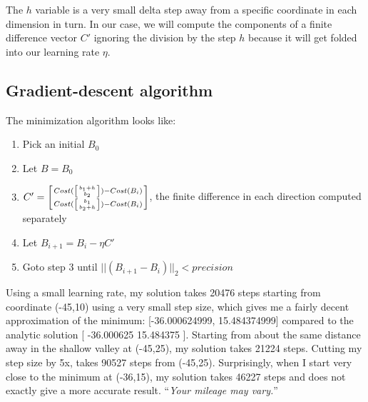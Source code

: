 \documentclass[titlepage]{tufte-book}
\begin{document}
\begin{fullwidth}
\noindent The $h$ variable is a very small delta step away from a specific coordinate in each dimension in turn. In our case, we will compute the components of a finite difference vector $C'$ ignoring the division by the step $h$ because it will get folded into our learning rate $\eta$.

\subsection{Gradient-descent algorithm}

The minimization algorithm looks like:

\begin{enumerate}
\item Pick an initial $B_0$
\item Let $B = B_0$
\item $C' = \left[ Cost(\left[ b_1+h \above 0pt{b_2} \right]) - Cost(B_i) \above 0pt Cost(\left[ b_1 \above 0pt{b_2+h} \right]) - Cost(B_i) \right]$, the finite difference in each direction computed separately
\item Let $B_{i+1} = B_i - \eta C'$
\item Goto step 3 until $||(B_{i+1}-B_i)||_2 < precision$
\end{enumerate}

Using a small learning rate, my solution takes 20476 steps starting from coordinate (-45,10) using a very small step size, which gives me a fairly decent approximation of the minimum: [-36.000624999, 15.484374999] compared to the analytic solution [ -36.000625 15.484375 ]. Starting from about the same distance away in the shallow valley at (-45,25), my solution takes 21224 steps. Cutting my step size by 5x, takes 90527 steps from (-45,25). Surprisingly, when I start very close to the minimum at (-36,15), my solution takes 46227 steps and does not exactly give a more accurate result. ``{\em Your mileage may vary.}''


\end{fullwidth}
\end{document}
